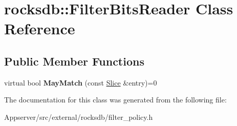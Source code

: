 \hypertarget{classrocksdb_1_1FilterBitsReader}{}\section{rocksdb\+:\+:Filter\+Bits\+Reader Class Reference}
\label{classrocksdb_1_1FilterBitsReader}
\subsection*{Public Member Functions}
\begin{DoxyCompactItemize}
\item 
virtual bool {\bfseries May\+Match} (const \hyperlink{classrocksdb_1_1Slice}{Slice} \&entry)=0\hypertarget{classrocksdb_1_1FilterBitsReader_a0cd48328c31812cfc82c472416bff4df}{}\label{classrocksdb_1_1FilterBitsReader_a0cd48328c31812cfc82c472416bff4df}

\end{DoxyCompactItemize}


The documentation for this class was generated from the following file\+:\begin{DoxyCompactItemize}
\item 
Appserver/src/external/rocksdb/filter\+\_\+policy.\+h\end{DoxyCompactItemize}
